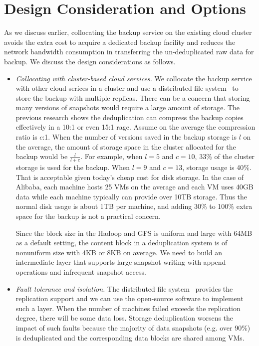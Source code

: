 \section{Design Consideration and Options}
\label{sect:options}

As we discuss earlier, collocating the backup service on the existing
cloud cluster avoids the extra cost to acquire a dedicated backup facility
and reduces the network bandwidth consumption in transferring the un-deduplicated
raw data for backup. 
We discuss the design considerations as follows. 

\begin{itemize}
\item {\em Collocating with cluster-based cloud services.}
We collocate the backup service with other cloud serices in a cluster
and  use a distributed file system~\cite{GFS2004,Hadoop}  to 
store the backup with multiple replicas. 
There can be a concern that storing many versions  of snapshots would
require	a large amount of storage.
The previous research shows the deduplication can compress the backup copies 
effectively in a 10:1 or even 15:1 rage. Assume on the average the compression
ratio is $c$:1.  When the number of versions
saved in the backup storage is $l$  on the average, 
the amount of storage space in the cluster allocated  for the backup would be $\frac{l}{l+c}$.
For example, when $l=5$ and $c=10$, 33\% of the cluster storage is used for the backup.
When $l=9$ and $c=13$, storage usage is 40\%. 
That is acceptable given today's cheap cost for disk storage.
In the case of Alibaba, each machine hosts 25 VMs on the average and each VM uses 40GB data
while each machine typically can provide over 10TB storage.
Thus the normal disk usage  is about 1TB per machine, and adding 30\% to 100\% 
extra space for the backup is not a practical concern.

Since the block size in the Hadoop and GFS is uniform and large with 64MB as a default setting,
the content block in a deduplication system is of nonuniform size with 4KB or 8KB on average.
We need to build an intermediate layer that supports large snapshot writing with append operations
and infrequent snapshot access.

\item {\em Fault tolerance and isolation.}
The distributed file system~\cite{GoogleFS,Hadoop} provides the replication support
and we can use the open-source software to implement such a layer.
When the number of machines failed exceeds the replication degree, there will be
 some data loss.  Storage deduplication worsens the impact of such faults
because  the majority of data snapshots (e.g. over 90\%) is deduplicated
and the corresponding data blocks are shared among VMs.


\end{itemize}
